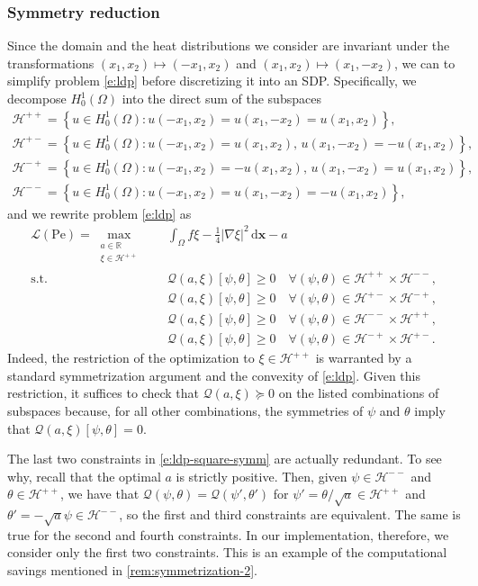 \documentclass[a4paper, 10pt]{amsart}
\numberwithin{equation}{section}
\theoremstyle{plain}
\theoremstyle{definition}
\theoremstyle{remark}
\newcommand{\cal}[1]{\mathcal{#1}}
\newcommand{\R}{\mathbb{R}}
\newcommand{\Pe}{\mathrm{Pe}}
\newcommand{\Hpp}{\cal{H}^{++}}
\newcommand{\Hpm}{\cal{H}^{+-}}
\newcommand{\Hmp}{\cal{H}^{-+}}
\newcommand{\Hmm}{\cal{H}^{--}}
\newcommand{\QF}{\mathcal{Q}}
\renewcommand{\vec}[1]{\mathbf{#1}}
\newcommand{\abs}[1]{\left\vert #1 \right\vert}
\newcommand{\dx}{\mathrm{d} \vec{x}}
\newcommand{\lb}{\mathcal{L}}
\begin{document}
\subsubsection{Symmetry reduction}
\label{ss:example-square-symm}
Since the domain and the heat distributions we consider are invariant under the transformations $(x_1, x_2)\mapsto(-x_1, x_2)$ and $(x_1, x_2)\mapsto(x_1, -x_2)$, we can to simplify problem \cref{e:ldp} before discretizing it into an SDP. Specifically, we decompose $H^1_0(\Omega)$ into the direct sum of the subspaces
\begin{gather*}
    \Hpp = \left\{u \in H^1_0(\Omega): u(-x_1, x_2)=u(x_1, -x_2)=u(x_1, x_2)\right\},\\
    \Hpm = \left\{u \in H^1_0(\Omega): u(-x_1, x_2)=u(x_1, x_2),\, u(x_1, -x_2)=-u(x_1, x_2)\right\},\\
    \Hmp = \left\{u \in H^1_0(\Omega): u(-x_1, x_2)=-u(x_1, x_2),\, u(x_1, -x_2)=u(x_1, x_2)\right\},\\
    \Hmm = \left\{u \in H^1_0(\Omega): u(-x_1, x_2)=u(x_1, -x_2)=-u(x_1, x_2)\right\},
\end{gather*}
and we rewrite problem \cref{e:ldp} as
\begin{align}\label{e:ldp-square-symm}
    \lb(\Pe) = \max_{\substack{a \in \R \\ \xi \in \Hpp}}\quad
    &\int_\Omega f\xi - \frac14 \abs{\nabla \xi}^2 \,\dx - a
    \\
    \nonumber
    \text{s.t.}\quad
    &\QF\left(a,\xi\right)[\psi,\theta] \geq 0 \quad \forall (\psi,\theta) \in \Hpp \times \Hmm,\\\nonumber
    &\QF\left(a,\xi\right)[\psi,\theta] \geq 0 \quad \forall (\psi,\theta) \in \Hpm \times \Hmp,\\\nonumber
    &\QF\left(a,\xi\right)[\psi,\theta] \geq 0 \quad \forall (\psi,\theta) \in \Hmm \times \Hpp,\\\nonumber
    &\QF\left(a,\xi\right)[\psi,\theta] \geq 0 \quad \forall (\psi,\theta) \in \Hmp \times \Hpm.
\end{align}
Indeed, the restriction of the optimization to $\xi \in \Hpp$ is warranted by a standard symmetrization argument and the convexity of \cref{e:ldp}. Given this restriction, it suffices to check that $\QF\left(a,\xi\right)\succeq 0$ on the listed combinations of subspaces because, for all other combinations, the symmetries of $\psi$ and $\theta$ imply that $\QF\left(a,\xi\right)[\psi,\theta]=0$.

The last two constraints in \cref{e:ldp-square-symm} are actually redundant. To see why, recall that the optimal $a$ is strictly positive. Then, given $\psi \in \Hmm$ and $\theta \in \Hpp$, we have that $\QF(\psi,\theta)=\QF(\psi',\theta')$ for $\psi'=\theta / \sqrt{a}\in \Hpp$ and $\theta'=-\sqrt{a}\psi \in \Hmm$, so the first and third constraints are equivalent. The same is true for the second and fourth constraints. In our implementation, therefore, we consider only the first two constraints. This is an example of the computational savings mentioned in \cref{rem:symmetrization-2}.
\end{document}
